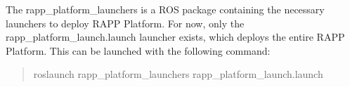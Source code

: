 The {\ttfamily rapp\-\_\-platform\-\_\-launchers} is a R\-O\-S package containing the necessary launchers to deploy R\-A\-P\-P Platform. For now, only the {\ttfamily rapp\-\_\-platform\-\_\-launch.\-launch} launcher exists, which deploys the entire R\-A\-P\-P Platform. This can be launched with the following command\-:

\begin{quotation}
roslaunch rapp\-\_\-platform\-\_\-launchers rapp\-\_\-platform\-\_\-launch.\-launch \end{quotation}
